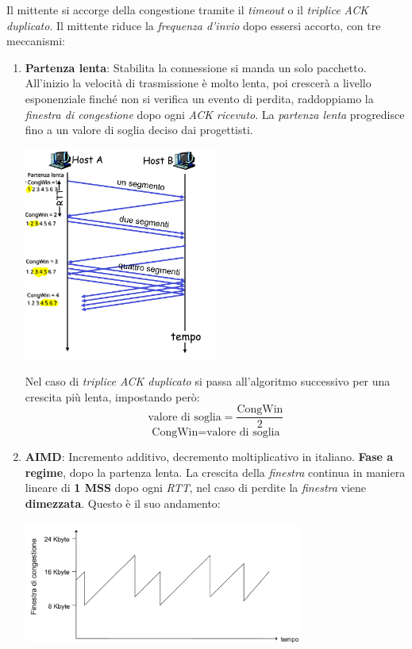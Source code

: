 Il mittente si accorge della congestione tramite il \textit{timeout} o il \textit{triplice ACK duplicato}.
Il mittente riduce la \textit{frequenza d'invio} dopo essersi accorto, con tre meccanismi:
\begin{enumerate}
  \item \textbf{Partenza lenta}: Stabilita la connessione si manda un solo pacchetto. All'inizio la velocità di trasmissione è molto lenta, poi crescerà a livello esponenziale finché non si verifica un evento di perdita, raddoppiamo la \textit{finestra di congestione} dopo ogni \textit{ACK ricevuto}. La \textit{partenza lenta} progredisce fino a un valore di soglia deciso dai progettisti.
    \begin{center}
    \includegraphics[width=\textwidth, height=7cm, keepaspectratio]{./img/partenzalenta.png}
    \end{center}
    Nel caso di \textit{triplice ACK duplicato} si passa all'algoritmo successivo per una crescita più lenta, impostando però:
    \[\text{valore di soglia} = \frac{\text{CongWin}}{2}\]
    \[\text{CongWin} = \text{valore di soglia}\]
  \item \textbf{AIMD}: Incremento additivo, decremento moltiplicativo in italiano. \textbf{Fase a regime}, dopo la partenza lenta. La crescita della \textit{finestra} continua in maniera lineare di \textbf{1 MSS} dopo ogni \textit{RTT}, nel caso di perdite la \textit{finestra} viene \textbf{dimezzata}. Questo è il suo andamento:
    \begin{center}
    \includegraphics[width=\textwidth, height=4cm, keepaspectratio]{./img/AIMD.png}

\end{center}
\end{enumerate}
